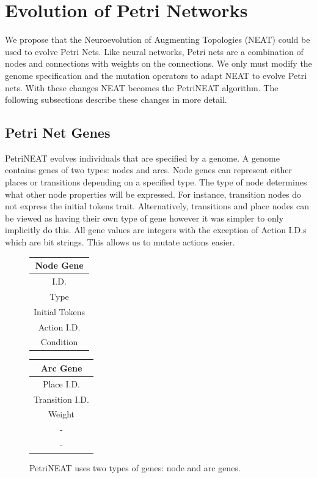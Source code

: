 \documentclass[12pt,a4paper,twocolumn]{article}
\begin{document}
\section{Evolution of Petri Networks}

We propose that the Neuroevolution of Augmenting Topologies (NEAT) could be used to evolve Petri Nets. Like neural networks, Petri nets are a combination of nodes and connections with weights on the connections. We only must modify the genome specification and the mutation operators to adapt NEAT to evolve Petri nets. With these changes NEAT becomes the PetriNEAT algorithm. The following subsections describe these changes in more detail.

\subsection{Petri Net Genes}

PetriNEAT evolves individuals that are specified by a genome. A genome contains genes of two types: nodes and arcs. Node genes can represent either places or transitions depending on a specified type. The type of node determines what other node properties will be expressed. For instance, transition nodes do not express the initial tokens trait. Alternatively, transitions and place nodes can be viewed as having their own type of gene however it was simpler to only implicitly do this. All gene values are integers with the exception of Action I.D.s which are bit strings. This allows us to mutate actions easier.

\begin{figure}
\centering
\begin{tabular}{|c|}
\hline
Node Gene\\ \hline
I.D. \\
Type \\
Initial Tokens \\
Action I.D. \\
Condition \\
\hline
\end{tabular}
\begin{tabular}{|c|}
\hline
Arc Gene\\ \hline
Place I.D.\\
Transition I.D.\\
Weight \\
 - \\
 -\\
\hline
\end{tabular}
\caption{PetriNEAT uses two types of genes: node and arc genes.}
\end{figure}
\end{document}

